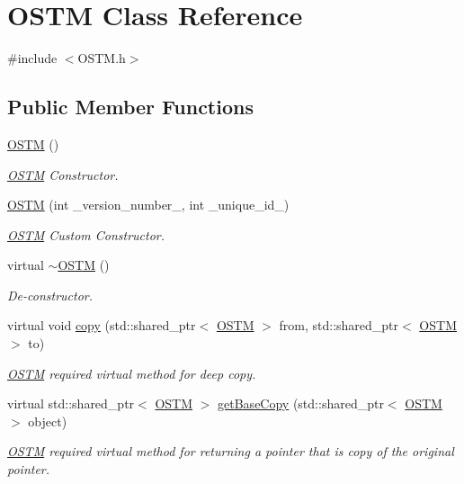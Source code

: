 \hypertarget{class_o_s_t_m}{}\section{O\+S\+TM Class Reference}
\label{class_o_s_t_m}


{\ttfamily \#include $<$O\+S\+T\+M.\+h$>$}

\subsection*{Public Member Functions}
\begin{DoxyCompactItemize}
\item 
\hyperlink{class_o_s_t_m_a968edf778668bd0ec7603f0571619196}{O\+S\+TM} ()
\begin{DoxyCompactList}\small\item\em \hyperlink{class_o_s_t_m}{O\+S\+TM} Constructor. \end{DoxyCompactList}\item 
\hyperlink{class_o_s_t_m_a2314f55a127b94aa8a51d19ba798401e}{O\+S\+TM} (int \+\_\+version\+\_\+number\+\_\+, int \+\_\+unique\+\_\+id\+\_\+)
\begin{DoxyCompactList}\small\item\em \hyperlink{class_o_s_t_m}{O\+S\+TM} Custom Constructor. \end{DoxyCompactList}\item 
virtual \hyperlink{class_o_s_t_m_a30a17d73d0259c60eeab72d6dfa9ceb1}{$\sim$\+O\+S\+TM} ()
\begin{DoxyCompactList}\small\item\em De-\/constructor. \end{DoxyCompactList}\item 
virtual void \hyperlink{class_o_s_t_m_a535d90fced5adbb70312c92f3778e08d}{copy} (std\+::shared\+\_\+ptr$<$ \hyperlink{class_o_s_t_m}{O\+S\+TM} $>$ from, std\+::shared\+\_\+ptr$<$ \hyperlink{class_o_s_t_m}{O\+S\+TM} $>$ to)
\begin{DoxyCompactList}\small\item\em \hyperlink{class_o_s_t_m}{O\+S\+TM} required virtual method for deep copy. \end{DoxyCompactList}\item 
virtual std\+::shared\+\_\+ptr$<$ \hyperlink{class_o_s_t_m}{O\+S\+TM} $>$ \hyperlink{class_o_s_t_m_a0bfa3763bd441407dd6365f42714f94c}{get\+Base\+Copy} (std\+::shared\+\_\+ptr$<$ \hyperlink{class_o_s_t_m}{O\+S\+TM} $>$ object)
\begin{DoxyCompactList}\small\item\em \hyperlink{class_o_s_t_m}{O\+S\+TM} required virtual method for returning a pointer that is copy of the original pointer. \end{DoxyCompactList}\item 

\end{DoxyCompactItemize}
